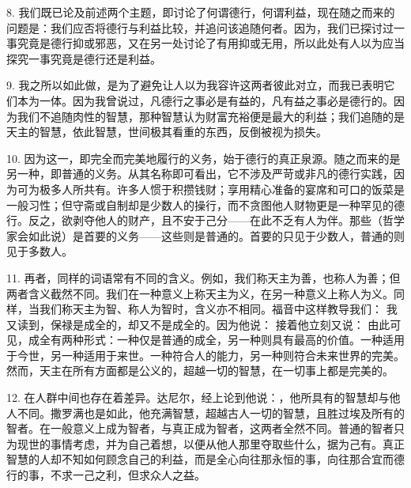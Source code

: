 8. 我们既已论及前述两个主题，即讨论了何谓德行，何谓利益，现在随之而来的问题是：我们应否将德行与利益比较，并追问该追随何者。因为，我们已探讨过一事究竟是德行抑或邪恶，又在另一处讨论了有用抑或无用，所以此处有人以为应当探究一事究竟是德行还是利益。\par

9. 我之所以如此做，是为了避免让人以为我容许这两者彼此对立，而我已表明它们本为一体。因为我曾说过，凡德行之事必是有益的，凡有益之事必是德行的。因为我们不追随肉性的智慧，那种智慧认为财富充裕便是最大的利益；我们追随的是天主的智慧，依此智慧，世间极其看重的东西，反倒被视为损失。\par

10. 因为这一，即完全而完美地履行的义务，始于德行的真正泉源。随之而来的是另一种，即普通的义务。从其名称即可看出，它不涉及严苛或非凡的德行实践，因为可为极多人所共有。许多人惯于积攒钱财；享用精心准备的宴席和可口的饭菜是一般习性；但守斋或自制却是少数人的操行，而不贪图他人财物更是一种罕见的德行。反之，欲剥夺他人的财产，且不安于己分——在此不乏有人为伴。那些（哲学家会如此说）是首要的义务——这些则是普通的。首要的只见于少数人，普通的则见于多数人。\par

11. 再者，同样的词语常有不同的含义。例如，我们称天主为善，也称人为善；但两者含义截然不同。我们在一种意义上称天主为义，在另一种意义上称人为义。同样，当我们称天主为智、称人为智时，含义亦不相同。福音中这样教导我们： 我又读到，保禄是成全的，却又不是成全的。因为他说： 接着他立刻又说： 由此可见，成全有两种形式：一种仅是普通的成全，另一种则具有最高的价值。一种适用于今世，另一种适用于来世。一种符合人的能力，另一种则符合未来世界的完美。然而，天主在所有方面都是公义的，超越一切的智慧，在一切事上都是完美的。\par

12. 在人群中间也存在着差异。达尼尔，经上论到他说：，他所具有的智慧却与他人不同。撒罗满也是如此，他充满智慧，超越古人一切的智慧，且胜过埃及所有的智者。在一般意义上成为智者，与真正成为智者，这两者全然不同。普通的智者只为现世的事情考虑，并为自己着想，以便从他人那里夺取些什么，据为己有。真正智慧的人却不知如何顾念自己的利益，而是全心向往那永恒的事，向往那合宜而德行的事，不求一己之利，但求众人之益。\par

